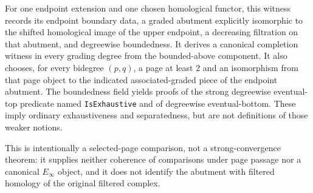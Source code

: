 \begin{definition}
  \label{def:page-abutment-comparison-witness}
  \leanok
  For one endpoint extension and one chosen homological functor, this witness
  records its endpoint boundary data, a graded abutment explicitly isomorphic
  to the shifted homological image of the upper endpoint, a decreasing
  filtration on that abutment, and degreewise boundedness.  It derives a
  canonical completion witness in every grading degree from the bounded-above
  component.  It also chooses, for every bidegree $(p,q)$, a page at least $2$
  and an isomorphism from that page object to the indicated associated-graded
  piece of the endpoint abutment.  The boundedness field yields proofs
  of the strong degreewise eventual-top predicate named
  \texttt{IsExhaustive} and of degreewise eventual-bottom.  These imply
  ordinary exhaustiveness and separatedness, but are not definitions of those
  weaker notions.

  This is intentionally a selected-page comparison, not a strong-convergence
  theorem: it supplies neither coherence of comparisons under page passage nor
  a canonical $E_\infty$ object, and it does not identify the abutment with
  filtered homology of the original filtered complex.
\end{definition}

